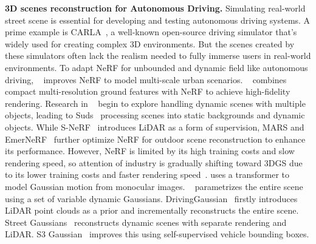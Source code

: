 \noindent\textbf{3D scenes reconstruction for Autonomous Driving. } 
Simulating real-world street scene is essential for developing and testing autonomous driving systems. A prime example is CARLA~\cite{dosovitskiy17}, a well-known open-source driving simulator that's widely used for creating complex 3D environments. But the scenes created by these simulators often lack the realism needed to fully immerse users in real-world environments. 
To adapt NeRF for unbounded and dynamic field like autonomous driving, ~\cite{martin2021NeRF, turki2022mega} improves NeRF to model multi-scale urban scenarios. ~\cite{xu2023grid} combines compact multi-resolution ground features with NeRF to achieve high-fidelity rendering. Research in ~\cite{ost2021neural, song2022towards} begin to explore handling dynamic scenes with multiple objects, leading to Suds~\cite{turki2023suds} processing scenes into static backgrounds and dynamic objects. While S-NeRF~\cite{xie2023s} introduces LiDAR as a form of supervision, MARS and EmerNeRF~\cite{wu2023mars, yang2023emernerf} further optimize NeRF for outdoor scene reconstruction to enhance its performance. However, NeRF is limited by its high training costs and slow rendering speed, so attention of industry is gradually shifting toward 3DGS due to its lower training costs and faster rendering speed~\cite{kerbl20233d}. \cite{yang2024deformable} uses a transformer to model Gaussian motion from monocular images. ~\cite{luiten2023dynamic} parametrizes the entire scene using a set of variable dynamic Gaussians. DrivingGaussian~\cite{zhou2024drivinggaussian} firstly introduces LiDAR point clouds as a prior and incrementally reconstructs the entire scene. Street Gaussians~\cite{yan2024street} reconstructs dynamic scenes with separate rendering and LiDAR. S3 Gaussian~\cite{huang2024textit} improves this using self-supervised vehicle bounding boxes. 

